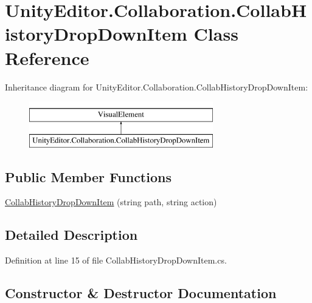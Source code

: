 \hypertarget{class_unity_editor_1_1_collaboration_1_1_collab_history_drop_down_item}{}\section{Unity\+Editor.\+Collaboration.\+Collab\+History\+Drop\+Down\+Item Class Reference}
\label{class_unity_editor_1_1_collaboration_1_1_collab_history_drop_down_item}
Inheritance diagram for Unity\+Editor.\+Collaboration.\+Collab\+History\+Drop\+Down\+Item\+:\begin{figure}[H]
\begin{center}
\leavevmode
\includegraphics[height=2.000000cm]{class_unity_editor_1_1_collaboration_1_1_collab_history_drop_down_item}
\end{center}
\end{figure}
\subsection*{Public Member Functions}
\begin{DoxyCompactItemize}
\item 
\mbox{\hyperlink{class_unity_editor_1_1_collaboration_1_1_collab_history_drop_down_item_a31e592db08f3795eca0048382402da81}{Collab\+History\+Drop\+Down\+Item}} (string path, string action)
\end{DoxyCompactItemize}


\subsection{Detailed Description}


Definition at line 15 of file Collab\+History\+Drop\+Down\+Item.\+cs.



\subsection{Constructor \& Destructor Documentation}
\mbox{\label{class_unity_editor_1_1_collaboration_1_1_collab_history_drop_down_item_a31e592db08f3795eca0048382402da81}} 
